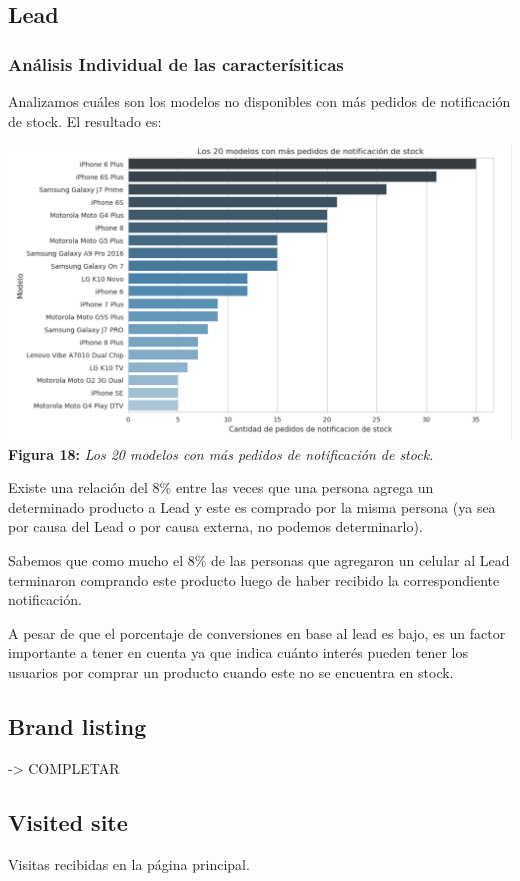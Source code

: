 \documentclass[titlepage,a4paper]{article}
\begin{document}
	\subsection{Lead}
	\subsubsection{Análisis Individual de las caracterísiticas}
	Analizamos cuáles son los modelos no disponibles con más pedidos de notificación de stock. El resultado es:
	\begin{center}
	\includegraphics[width=15cm] {los20modelosConMasPedidosDeNotificacionDeStock.jpg}\\
	\textbf{Figura 18:}  \textit{Los 20 modelos con más pedidos de notificación de stock.}
	\end{center}

	Existe una relación del 8\% entre las veces que una persona agrega un determinado producto a Lead y este es comprado por la misma persona (ya sea por causa del Lead o por causa externa, no podemos determinarlo).
	
	Sabemos que como mucho el 8\% de las personas que agregaron un celular al Lead terminaron comprando este producto luego de haber recibido la correspondiente notificación.
	
	A pesar de que el porcentaje de conversiones en base al lead es bajo, es un factor importante a tener en cuenta ya que indica cuánto interés pueden tener los usuarios por comprar un producto cuando este no se encuentra en stock.
	
	\subsection{Brand listing} -> COMPLETAR
	\subsection{Visited site}
	Visitas recibidas en la página principal.
\end{document}
